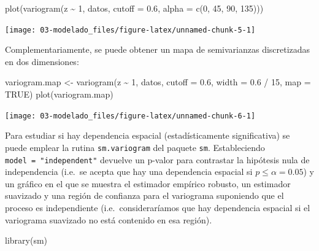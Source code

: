 \documentclass[
  spanish,
]{book}
\newenvironment{Shaded}{\begin{snugshade}}{\end{snugshade}}
\newcommand{\AttributeTok}[1]{\textcolor[rgb]{0.77,0.63,0.00}{#1}}
\newcommand{\ConstantTok}[1]{\textcolor[rgb]{0.00,0.00,0.00}{#1}}
\newcommand{\DecValTok}[1]{\textcolor[rgb]{0.00,0.00,0.81}{#1}}
\newcommand{\FloatTok}[1]{\textcolor[rgb]{0.00,0.00,0.81}{#1}}
\newcommand{\FunctionTok}[1]{\textcolor[rgb]{0.00,0.00,0.00}{#1}}
\newcommand{\NormalTok}[1]{#1}
\newcommand{\OtherTok}[1]{\textcolor[rgb]{0.56,0.35,0.01}{#1}}
\newcommand{\SpecialCharTok}[1]{\textcolor[rgb]{0.00,0.00,0.00}{#1}}
\theoremstyle{break}
\theoremstyle{definition}
\theoremstyle{definition}
\theoremstyle{definition}
\theoremstyle{definition}
\theoremstyle{remark}
\begin{document}
\begin{Shaded}
\begin{Highlighting}[]
\FunctionTok{plot}\NormalTok{(}\FunctionTok{variogram}\NormalTok{(z }\SpecialCharTok{\textasciitilde{}} \DecValTok{1}\NormalTok{, datos, }\AttributeTok{cutoff =} \FloatTok{0.6}\NormalTok{, }\AttributeTok{alpha =} \FunctionTok{c}\NormalTok{(}\DecValTok{0}\NormalTok{, }\DecValTok{45}\NormalTok{, }\DecValTok{90}\NormalTok{, }\DecValTok{135}\NormalTok{)))}
\end{Highlighting}
\end{Shaded}

\begin{center}\texttt{[image: 03-modelado\_files/figure-latex/unnamed-chunk-5-1]} \end{center}

Complementariamente, se puede obtener un mapa de semivarianzas discretizadas en dos dimensiones:

\begin{Shaded}
\begin{Highlighting}[]
\NormalTok{variogram.map }\OtherTok{\textless{}{-}} \FunctionTok{variogram}\NormalTok{(z }\SpecialCharTok{\textasciitilde{}} \DecValTok{1}\NormalTok{, datos, }\AttributeTok{cutoff =} \FloatTok{0.6}\NormalTok{, }\AttributeTok{width =} \FloatTok{0.6} \SpecialCharTok{/} \DecValTok{15}\NormalTok{, }\AttributeTok{map =} \ConstantTok{TRUE}\NormalTok{)}
\FunctionTok{plot}\NormalTok{(variogram.map)}
\end{Highlighting}
\end{Shaded}

\begin{center}\texttt{[image: 03-modelado\_files/figure-latex/unnamed-chunk-6-1]} \end{center}

Para estudiar si hay dependencia espacial (estadísticamente significativa) se puede emplear la rutina \texttt{sm.variogram} del paquete \texttt{sm}.
Estableciendo \texttt{model\ =\ "independent"} devuelve un p-valor para contrastar la hipótesis nula de independencia
(i.e.~se acepta que hay una dependencia espacial si \(p \leq \alpha = 0.05\)) y un gráfico en el que se muestra el estimador empírico robusto, un estimador suavizado y una región de confianza para el variograma suponiendo que el proceso es independiente (i.e.~consideraríamos que hay dependencia espacial si el variograma suavizado no está contenido en esa región).

\begin{Shaded}
\begin{Highlighting}[]
\FunctionTok{library}\NormalTok{(sm)}
\end{Highlighting}
\end{Shaded}
\end{document}
